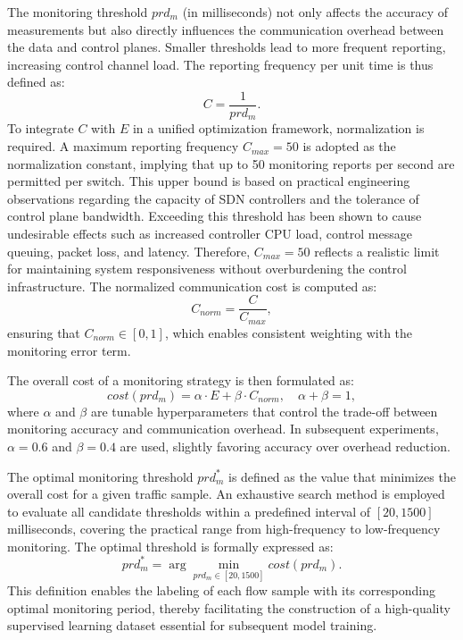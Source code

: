 The monitoring threshold $prd_m$ (in milliseconds) not only affects the accuracy of measurements but also directly influences the communication overhead between the data and control planes. 
Smaller thresholds lead to more frequent reporting, increasing control channel load. 
The reporting frequency per unit time is thus defined as:
\begin{equation}
    \label{eq:C}
    C = \frac{1}{prd_m} .
\end{equation}
To integrate $C$ with $E$ in a unified optimization framework, normalization is required. 
A maximum reporting frequency $C_{max} = 50$ is adopted as the normalization constant, implying that up to 50 monitoring reports per second are permitted per switch. 
This upper bound is based on practical engineering observations regarding the capacity of SDN controllers and the tolerance of control plane bandwidth. 
Exceeding this threshold has been shown to cause undesirable effects such as increased controller CPU load, control message queuing, packet loss, and latency. 
Therefore, $C_{max} = 50$ reflects a realistic limit for maintaining system responsiveness without overburdening the control infrastructure. 
The normalized communication cost is computed as:
\begin{equation}
    \label{eq:Cnorm}
    C_{norm} = \frac{C}{C_{max}} ,
\end{equation}
ensuring that $C_{norm} \in [0, 1]$, which enables consistent weighting with the monitoring error term.

The overall cost of a monitoring strategy is then formulated as:
\begin{equation}
    \label{eq:cost(prd_m)}
    cost(prd_m) = \alpha \cdot E + \beta \cdot C_{norm}, \quad \alpha + \beta = 1 ,
\end{equation}
where $\alpha$ and $\beta$ are tunable hyperparameters that control the trade-off between monitoring accuracy and communication overhead. 
In subsequent experiments, $\alpha = 0.6$ and $\beta = 0.4$ are used, slightly favoring accuracy over overhead reduction.

The optimal monitoring threshold $prd_m^*$ is defined as the value that minimizes the overall cost for a given traffic sample. 
An exhaustive search method is employed to evaluate all candidate thresholds within a predefined interval of $[20, 1500]$ milliseconds, covering the practical range from high-frequency to low-frequency monitoring. 
The optimal threshold is formally expressed as:
\begin{equation}
    prd_m^* = \arg\min_{prd_m \in [20, 1500]} cost(prd_m) .
\end{equation}
This definition enables the labeling of each flow sample with its corresponding optimal monitoring period, thereby facilitating the construction of a high-quality supervised learning dataset essential for subsequent model training.

